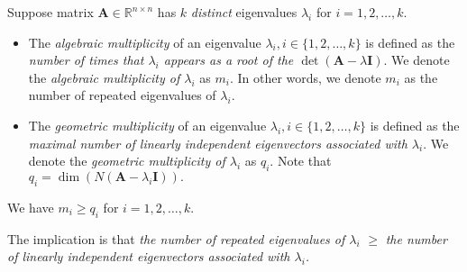 \begin{definition}[Multiplicity]
Suppose matrix $\bm A\in\mathbb{R}^{n\times n}$ has $k$ \emph{distinct} eigenvalues $\lambda_i$ for $i=1,2,\dots,k$.
\begin{itemize}
\item
The \emph{algebraic multiplicity} of an eigenvalue $\lambda_i,i\in\{1,2,\dots,k\}$ is defined as the \textit{number of times that $\lambda_i$ appears as a root of the $\det(\bm A-\lambda\bm I)$}. We denote the \textit{algebraic multiplicity of $\lambda_i$} as $m_i$. In other words, we denote $m_i$ as the number of repeated eigenvalues of $\lambda_i$.
\item
The \emph{geometric multiplicity} of an eigenvalue $\lambda_i,i\in\{1,2,\dots,k\}$ is defined as the \textit{maximal number of \emph{linearly independent} eigenvectors associated with $\lambda_i$}. We denote the \textit{geometric multiplicity of $\lambda_i$} as $q_i$. Note that $q_i=\dim(N(\bm A-\lambda_i\bm I)).$
\end{itemize}
\end{definition}
\begin{proposition}
We have $m_i\ge q_i$ for $i=1,2,\dots,k$.
\end{proposition}
The implication is that \emph{the number of repeated eigenvalues of $\lambda_i$} $\ge$ \emph{the number of linearly independent eigenvectors associated with $\lambda_i$.}


